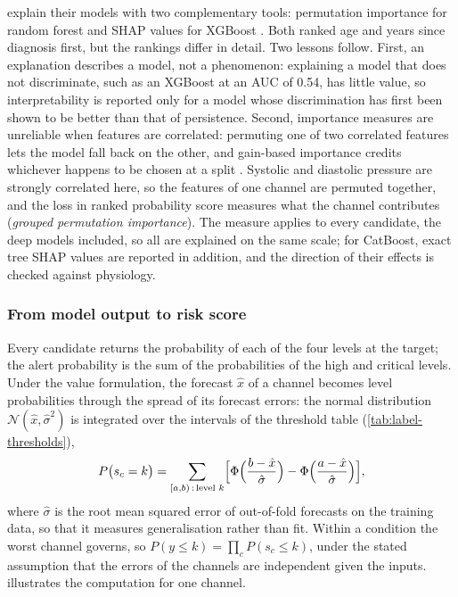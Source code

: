 \Textcite{mendoza2025} explain their models with two complementary tools: permutation importance for random forest and SHAP values for XGBoost \parencite{lundberg2017}. Both ranked age and years since diagnosis first, but the rankings differ in detail. Two lessons follow. First, an explanation describes a model, not a phenomenon: explaining a model that does not discriminate, such as an XGBoost at an AUC of 0.54, has little value, so interpretability is reported only for a model whose discrimination has first been shown to be better than that of persistence. Second, importance measures are unreliable when features are correlated: permuting one of two correlated features lets the model fall back on the other, and gain-based importance credits whichever happens to be chosen at a split \parencite{strobl2008,gregorutti2017}. Systolic and diastolic pressure are strongly correlated here, so the features of one channel are permuted together, and the loss in ranked probability score measures what the channel contributes (\emph{grouped permutation importance}). The measure applies to every candidate, the deep models included, so all are explained on the same scale; for CatBoost, exact tree SHAP values are reported in addition, and the direction of their effects is checked against physiology.

\subsubsection{From model output to risk score}\label{sec:risk-score}\label{sec:prior-correction}\label{sec:calibration}\label{sec:brier}

Every candidate returns the probability of each of the four levels at the target; the alert probability is the sum of the probabilities of the high and critical levels. Under the value formulation, the forecast $\hat{x}$ of a channel becomes level probabilities through the spread of its forecast errors: the normal distribution $\mathcal{N}(\hat{x}, \hat{\sigma}^2)$ is integrated over the intervals of the threshold table (\cref{tab:label-thresholds}),
\begin{equation}
  P\bigl(s_c = k\bigr) = \sum_{[a,b) \,:\, \text{level } k} \Bigl[\Phi\Bigl(\frac{b - \hat{x}}{\hat{\sigma}}\Bigr) - \Phi\Bigl(\frac{a - \hat{x}}{\hat{\sigma}}\Bigr)\Bigr],
\end{equation}
where $\hat{\sigma}$ is the root mean squared error of out-of-fold forecasts on the training data, so that it measures generalisation rather than fit. Within a condition the worst channel governs, so $P(y \leq k) = \prod_c P(s_c \leq k)$, under the stated assumption that the errors of the channels are independent given the inputs.  illustrates the computation for one channel.

